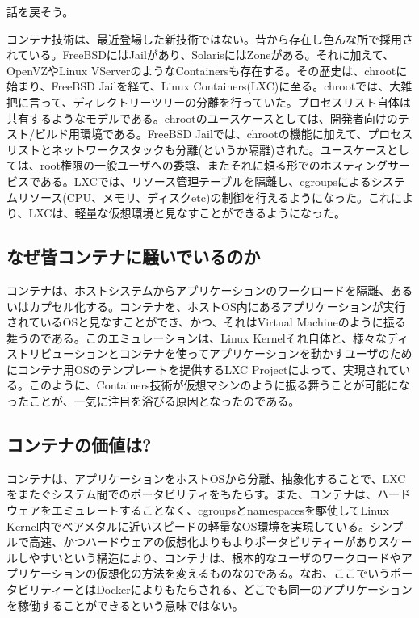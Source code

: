 ﻿\documentclass[9pt,b5paper,tombo,openany]{jsbook}
\begin{document}
\noindent
話を戻そう。

コンテナ技術は、最近登場した新技術ではない。昔から存在し色んな所で採用されている。FreeBSDにはJailがあり、SolarisにはZoneがある。それに加えて、OpenVZやLinux VServerのようなContainersも存在する。その歴史は、chrootに始まり、FreeBSD Jailを経て、Linux Containers(LXC)に至る。chrootでは、大雑把に言って、ディレクトリーツリーの分離を行っていた。プロセスリスト自体は共有するようなモデルである。chrootのユースケースとしては、開発者向けのテスト/ビルド用環境である。FreeBSD Jailでは、chrootの機能に加えて、プロセスリストとネットワークスタックも分離(というか隔離)された。ユースケースとしては、root権限の一般ユーザへの委譲、またそれに頼る形でのホスティングサービスである。LXCでは、リソース管理テーブルを隔離し、cgroupsによるシステムリソース(CPU、メモリ、ディスクetc)の制御を行えるようになった。これにより、LXCは、軽量な仮想環境と見なすことができるようになった。

\newpage

\subsection{なぜ皆コンテナに騒いでいるのか}
コンテナは、ホストシステムからアプリケーションのワークロードを隔離、あるいはカプセル化する。コンテナを、ホストOS内にあるアプリケーションが実行されているOSと見なすことができ、かつ、それはVirtual Machineのように振る舞うのである。このエミュレーションは、Linux Kernelそれ自体と、様々なディストリビューションとコンテナを使ってアプリケーションを動かすユーザのためにコンテナ用OSのテンプレートを提供するLXC Projectによって、実現されている。このように、Containers技術が仮想マシンのように振る舞うことが可能になったことが、一気に注目を浴びる原因となったのである。

\subsection{コンテナの価値は?}
コンテナは、アプリケーションをホストOSから分離、抽象化することで、LXCをまたぐシステム間でのポータビリティをもたらす。また、コンテナは、ハードウェアをエミュレートすることなく、cgroupsとnamespacesを駆使してLinux Kernel内でベアメタルに近いスピードの軽量なOS環境を実現している。シンプルで高速、かつハードウェアの仮想化よりもよりポータビリティーがありスケールしやすいという構造により、コンテナは、根本的なユーザのワークロードやアプリケーションの仮想化の方法を変えるものなのである。なお、ここでいうポータビリティーとはDockerによりもたらされる、どこでも同一のアプリケーションを稼働することができるという意味ではない。
\end{document}
